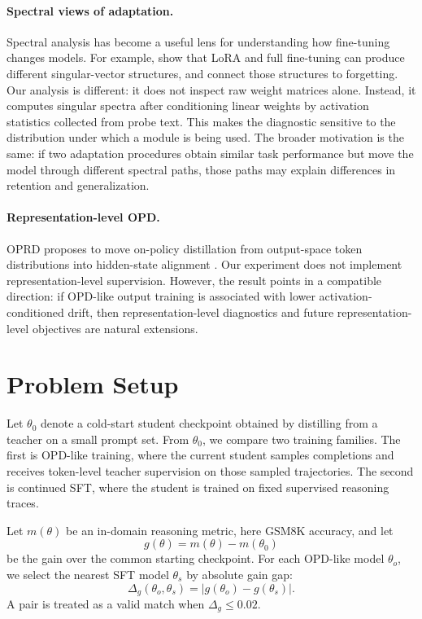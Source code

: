 \documentclass[letterpaper]{article}
\begin{document}
\paragraph{Spectral views of adaptation.}
Spectral analysis has become a useful lens for understanding how fine-tuning changes models.
For example, \citet{shuttleworth2025lora} show that LoRA and full fine-tuning can produce different singular-vector structures, and connect those structures to forgetting.
Our analysis is different: it does not inspect raw weight matrices alone.
Instead, it computes singular spectra after conditioning linear weights by activation statistics collected from probe text.
This makes the diagnostic sensitive to the distribution under which a module is being used.
The broader motivation is the same: if two adaptation procedures obtain similar task performance but move the model through different spectral paths, those paths may explain differences in retention and generalization.

\paragraph{Representation-level OPD.}
OPRD proposes to move on-policy distillation from output-space token distributions into hidden-state alignment \citep{yang2026oprd}.
Our experiment does not implement representation-level supervision.
However, the result points in a compatible direction: if OPD-like output training is associated with lower activation-conditioned drift, then representation-level diagnostics and future representation-level objectives are natural extensions.

\section{Problem Setup}

Let $\theta_0$ denote a cold-start student checkpoint obtained by distilling from a teacher on a small prompt set.
From $\theta_0$, we compare two training families.
The first is OPD-like training, where the current student samples completions and receives token-level teacher supervision on those sampled trajectories.
The second is continued SFT, where the student is trained on fixed supervised reasoning traces.

Let $m(\theta)$ be an in-domain reasoning metric, here GSM8K accuracy, and let
\begin{equation}
g(\theta) = m(\theta) - m(\theta_0)
\end{equation}
be the gain over the common starting checkpoint.
For each OPD-like model $\theta_o$, we select the nearest SFT model $\theta_s$ by absolute gain gap:
\begin{equation}
\Delta_g(\theta_o,\theta_s)=|g(\theta_o)-g(\theta_s)|.
\end{equation}
A pair is treated as a valid match when $\Delta_g \leq 0.02$.
\end{document}
